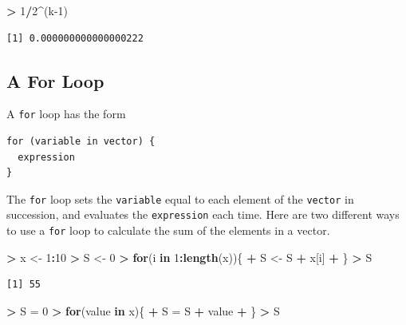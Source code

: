 \documentclass[
]{krantz}
\makeatletter
\newenvironment{Shaded}{\begin{snugshade}}{\end{snugshade}}
\newcommand{\ControlFlowTok}[1]{\textcolor[rgb]{0.27,0.27,0.27}{\textbf{#1}}}
\newcommand{\DecValTok}[1]{\textcolor[rgb]{0.06,0.06,0.06}{#1}}
\newcommand{\KeywordTok}[1]{\textcolor[rgb]{0.27,0.27,0.27}{\textbf{#1}}}
\newcommand{\NormalTok}[1]{#1}
\newcommand{\OperatorTok}[1]{\textcolor[rgb]{0.43,0.43,0.43}{\textbf{#1}}}
\newcommand{\StringTok}[1]{\textcolor[rgb]{0.5,0.5,0.5}{#1}}
\newenvironment{kframe}{%
\medskip{}
\setlength{\fboxsep}{.8em}
 \def\at@end@of@kframe{}%
 \ifinner\ifhmode%
  \def\at@end@of@kframe{\end{minipage}}%
  \begin{minipage}{\columnwidth}%
 \fi\fi%
 \def\FrameCommand##1{\hskip\@totalleftmargin \hskip-\fboxsep
 \colorbox{shadecolor}{##1}\hskip-\fboxsep
     \hskip-\linewidth \hskip-\@totalleftmargin \hskip\columnwidth}%
 \MakeFramed {\advance\hsize-\width
   \@totalleftmargin\z@ \linewidth\hsize
   \@setminipage}}%
 {\par\unskip\endMakeFramed%
 \at@end@of@kframe}
\renewenvironment{Shaded}{\begin{kframe}}{\end{kframe}}
\makeatother
\begin{document}
\begin{Shaded}
\begin{Highlighting}[]
\OperatorTok{\textgreater{}}\StringTok{ }\DecValTok{1}\OperatorTok{/}\DecValTok{2}\OperatorTok{\^{}}\NormalTok{(k}\DecValTok{{-}1}\NormalTok{)}
\end{Highlighting}
\end{Shaded}

\begin{verbatim}
[1] 0.000000000000000222
\end{verbatim}

\hypertarget{a-for-loop}{%
\subsection{A For Loop}\label{a-for-loop}}

A \texttt{for} loop has the form

\begin{verbatim}
for (variable in vector) {
  expression
}
\end{verbatim}

The \texttt{for} loop sets the \texttt{variable} equal to each element of the \texttt{vector} in succession, and evaluates the \texttt{expression} each time. Here are two different ways to use a \texttt{for} loop to calculate the sum of the elements in a vector.

\begin{Shaded}
\begin{Highlighting}[]
\OperatorTok{\textgreater{}}\StringTok{ }\NormalTok{x \textless{}{-}}\StringTok{ }\DecValTok{1}\OperatorTok{:}\DecValTok{10}
\OperatorTok{\textgreater{}}\StringTok{ }\NormalTok{S \textless{}{-}}\StringTok{ }\DecValTok{0}
\OperatorTok{\textgreater{}}\StringTok{ }\ControlFlowTok{for}\NormalTok{(i }\ControlFlowTok{in} \DecValTok{1}\OperatorTok{:}\KeywordTok{length}\NormalTok{(x))\{}
\OperatorTok{+}\StringTok{     }\NormalTok{S \textless{}{-}}\StringTok{ }\NormalTok{S }\OperatorTok{+}\StringTok{ }\NormalTok{x[i]}
\OperatorTok{+}\StringTok{ }\NormalTok{\}}
\OperatorTok{\textgreater{}}\StringTok{ }\NormalTok{S}
\end{Highlighting}
\end{Shaded}

\begin{verbatim}
[1] 55
\end{verbatim}

\begin{Shaded}
\begin{Highlighting}[]
\OperatorTok{\textgreater{}}\StringTok{ }\NormalTok{S =}\StringTok{ }\DecValTok{0}
\OperatorTok{\textgreater{}}\StringTok{ }\ControlFlowTok{for}\NormalTok{(value }\ControlFlowTok{in}\NormalTok{ x)\{}
\OperatorTok{+}\StringTok{   }\NormalTok{S =}\StringTok{ }\NormalTok{S }\OperatorTok{+}\StringTok{ }\NormalTok{value}
\OperatorTok{+}\StringTok{ }\NormalTok{\}}
\OperatorTok{\textgreater{}}\StringTok{ }\NormalTok{S}
\end{Highlighting}
\end{Shaded}
\end{document}
